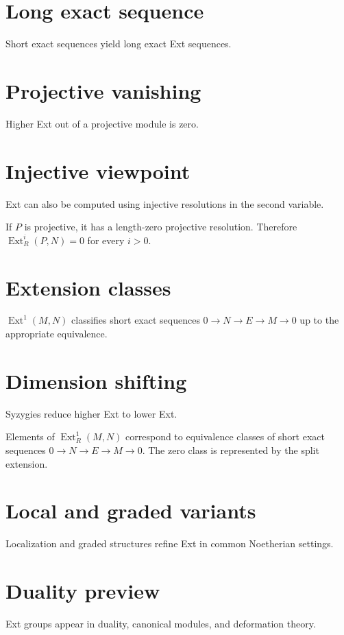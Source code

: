 \section{Long exact sequence}
Short exact sequences yield long exact Ext sequences.

\section{Projective vanishing}
Higher Ext out of a projective module is zero.

\section{Injective viewpoint}
Ext can also be computed using injective resolutions in the second variable.

\begin{example}\label{ex:v27-expand-02}
If $P$ is projective, it has a length-zero projective resolution. Therefore $\operatorname{Ext}^i_R(P,N)=0$ for every $i>0$.
\end{example}
\section{Extension classes}
$\operatorname{Ext}^1(M,N)$ classifies short exact sequences $0\to N\to E\to M\to0$ up to the appropriate equivalence.

\section{Dimension shifting}
Syzygies reduce higher Ext to lower Ext.

\begin{example}\label{ex:v27-expand-03}
Elements of $\operatorname{Ext}^1_R(M,N)$ correspond to equivalence classes of short exact sequences $0\to N\to E\to M\to0$. The zero class is represented by the split extension.
\end{example}
\section{Local and graded variants}
Localization and graded structures refine Ext in common Noetherian settings.

\section{Duality preview}
Ext groups appear in duality, canonical modules, and deformation theory.

